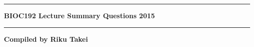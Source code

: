 \documentclass[a4paper,12pt]{report}
\newcommand{\HRule}{\rule {\linewidth}{0.5mm}}
\begin{document}
\begin{titlepage}

\begin{center}

\HRule
\vspace{0.4cm}
\Huge{\textbf{BIOC192 Lecture Summary Questions 2015}}
\HRule

\vfill
\LARGE{\textbf{Compiled by Riku Takei}}

\end{center}

\end{titlepage}

















\end{document}
